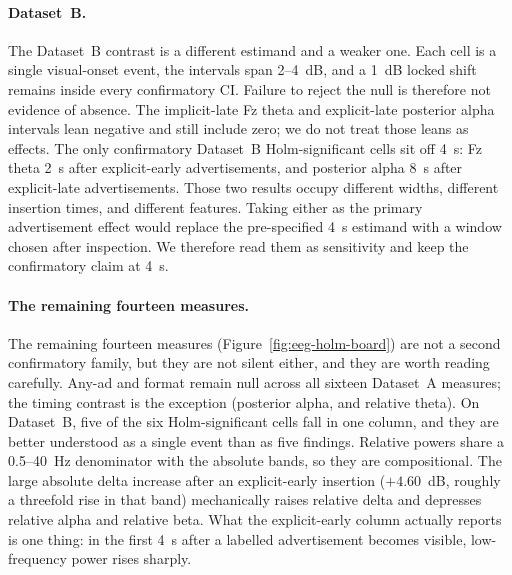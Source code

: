 \documentclass[english]{article}
\begin{document}
\paragraph{Dataset~B.}
The Dataset~B contrast is a different estimand and a weaker one. Each cell is a single visual-onset event, the intervals span 2--4~dB, and a 1~dB locked shift remains inside every confirmatory CI. Failure to reject the null is therefore not evidence of absence. The implicit-late Fz theta and explicit-late posterior alpha intervals lean negative and still include zero; we do not treat those leans as effects. The only confirmatory Dataset~B Holm-significant cells sit off 4~s: Fz theta 2~s after explicit-early advertisements, and posterior alpha 8~s after explicit-late advertisements. Those two results occupy different widths, different insertion times, and different features. Taking either as the primary advertisement effect would replace the pre-specified 4~s estimand with a window chosen after inspection. We therefore read them as sensitivity and keep the confirmatory claim at 4~s.

\paragraph{The remaining fourteen measures.}
The remaining fourteen measures (Figure~\ref{fig:eeg-holm-board}) are not a second confirmatory family, but they are not silent either, and they are worth reading carefully. Any-ad and format remain null across all sixteen Dataset~A measures; the timing contrast is the exception (posterior alpha, and relative theta). On Dataset~B, five of the six Holm-significant cells fall in one column, and they are better understood as a single event than as five findings. Relative powers share a 0.5--40~Hz denominator with the absolute bands, so they are compositional. The large absolute delta increase after an explicit-early insertion (\(+4.60\)~dB, roughly a threefold rise in that band) mechanically raises relative delta and depresses relative alpha and relative beta. What the explicit-early column actually reports is one thing: in the first 4~s after a labelled advertisement becomes visible, low-frequency power rises sharply.
\end{document}
